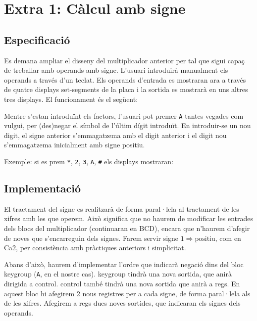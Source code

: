 \chapter{Extra 1: Càlcul amb signe}

\section{Especificació}

Es demana ampliar el disseny del multiplicador anterior per tal que sigui capaç de treballar amb operands amb signe. L'usuari introduirà manualment els operands a través d'un teclat. Els operands d'entrada es mostraran ara a través de quatre displays set-segments de la placa i la sortida es mostrarà en uns altres tres displays. El funcionament és el següent:

Mentre s'estan introduïnt els factors, l'usuari pot premer \texttt{A} tantes vegades com vulgui, per (des)negar el símbol de l'últim dígit introduït. En introduir-se un nou digit, el signe anterior s'emmagatzema amb el digit anterior i el digit nou s'emmagatzema inicialment amb signe positiu.

Exemple: si es prem \texttt{*}, \texttt{2}, \texttt{3}, \texttt{A}, \texttt{\#} els displays mostraran:

\begin{center}
\sevenseg{-}\sevenseg{ } \sevenseg{ }\sevenseg{-}
\end{center}

\section{Implementació}

El tractament del signe es realitzarà de forma paral·lela al tractament de les xifres amb les que operem. Això significa que no haurem de modificar les entrades dels blocs del multiplicador (continuaran en BCD), encara que n'haurem d'afegir de noves que s'encarreguin dels signes. Farem servir signe $1 \Rightarrow \text{positiu}$, com en Ca2, per consistència amb pràctiques anteriors i simplicitat.

Abans d'això, haurem d'implementar l'ordre que indicarà negació dins del bloc keygroup (\texttt{A}, en el nostre cas). \textsf{keygroup} tindrà una nova sortida, que anirà dirigida a \textsf{control}. \textsf{control} també tindrà una nova sortida que anirà a \textsf{regs}. En aquest bloc hi afegirem 2 nous registres per a cada signe, de forma paral·lela als de les xifres. Afegirem a \textsf{regs} dues noves sortides, que indicaran els signes dels operands.

